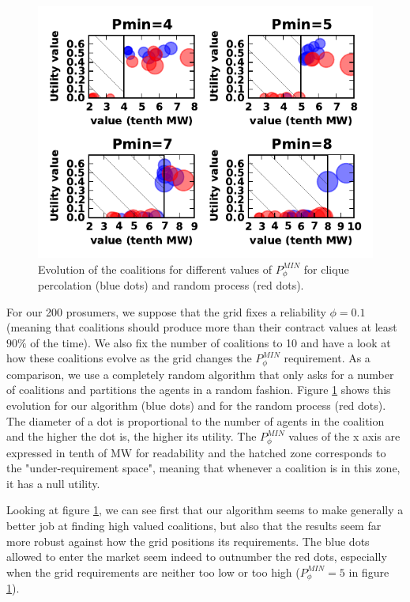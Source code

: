 \documentclass[conference]{IEEEtran}
\begin{document}
\begin{center}
\begin{figure}[b]
  \includegraphics[scale=0.8]{./figure5/coals.pdf}
  \caption{Evolution of the coalitions for different values of $ P_{\phi}^{MIN} $ for clique percolation (blue dots) and random process (red dots).}
  \label{Fig3}
\end{figure}
\end{center}

For our 200 prosumers, we suppose that the grid fixes a reliability $ \phi = 0.1 $ (meaning that coalitions should produce more than their contract values at least $ 90 \% $ of the time). We also fix the number of coalitions to 10 and have a look at how these coalitions evolve as the grid changes the $ P_{\phi}^{MIN} $ requirement. As a comparison, we use a completely random algorithm that only asks for a number of coalitions and partitions the agents in a random fashion. Figure \ref{Fig3} shows this evolution for our algorithm (blue dots) and for the random process (red dots). The diameter of a dot is proportional to the number of agents in the coalition and the higher the dot is, the higher its utility. The $ P_{\phi}^{MIN} $ values of the x axis are expressed in tenth of MW for readability and the hatched zone corresponds to the "under-requirement space", meaning that whenever a coalition is in this zone, it has a null utility. 

Looking at figure \ref{Fig3}, we can see first that our algorithm seems to make generally a better job at finding high valued coalitions, but also that the results seem far more robust against how the grid positions its requirements. The blue dots allowed to enter the market seem indeed to outnumber the red dots, especially when the grid requirements are neither too low or too high ($ P_{\phi}^{MIN} = 5 $ in figure \ref{Fig3}).
\end{document}
